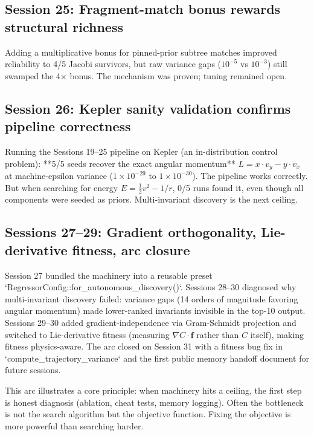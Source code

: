 \subsection{Session 25: Fragment-match bonus rewards structural richness}

Adding a multiplicative bonus for pinned-prior subtree matches improved reliability to 4/5 Jacobi survivors, but raw variance gaps ($10^{-5}$ vs $10^{-3}$) still swamped the 4× bonus. The mechanism was proven; tuning remained open.

\subsection{Session 26: Kepler sanity validation confirms pipeline correctness}

Running the Sessions 19--25 pipeline on Kepler (an in-distribution control problem): **5/5 seeds recover the exact angular momentum** $L = x \cdot v_y - y \cdot v_x$ at machine-epsilon variance ($1 \times 10^{-29}$ to $1 \times 10^{-30}$). The pipeline works correctly. But when searching for energy $E = \tfrac{1}{2}v^2 - 1/r$, 0/5 runs found it, even though all components were seeded as priors. Multi-invariant discovery is the next ceiling.

\subsection{Sessions 27--29: Gradient orthogonality, Lie-derivative fitness, arc closure}

Session 27 bundled the machinery into a reusable preset `RegressorConfig::for_autonomous_discovery()`. Sessions 28--30 diagnosed why multi-invariant discovery failed: variance gaps (14 orders of magnitude favoring angular momentum) made lower-ranked invariants invisible in the top-10 output. Sessions 29--30 added gradient-independence via Gram-Schmidt projection and switched to Lie-derivative fitness (measuring $\nabla C \cdot \mathbf{f}$ rather than $C$ itself), making fitness physics-aware. The arc closed on Session 31 with a fitness bug fix in `compute_trajectory_variance` and the first public memory handoff document for future sessions.

This arc illustrates a core principle: when machinery hits a ceiling, the first step is honest diagnosis (ablation, cheat tests, memory logging). Often the bottleneck is not the search algorithm but the objective function. Fixing the objective is more powerful than searching harder.

